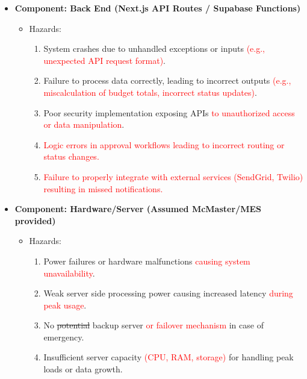 \documentclass{article}
\begin{document}
\begin{itemize}
    \item \textbf{Component: Back End (Next.js API Routes / Supabase Functions)} %
    \begin{itemize}
        \item Hazards:
        \begin{enumerate}
            \item System crashes due to unhandled exceptions or inputs \textcolor{red}{(e.g., unexpected API request format)}.
            \item Failure to process data correctly, leading to incorrect outputs \textcolor{red}{(e.g., miscalculation of budget totals, incorrect status updates)}.
            \item Poor security implementation exposing APIs \textcolor{red}{to unauthorized access or data manipulation}.
            \item \textcolor{red}{Logic errors in approval workflows leading to incorrect routing or status changes.}
            \item \textcolor{red}{Failure to properly integrate with external services (SendGrid, Twilio) resulting in missed notifications.}
        \end{enumerate}
    \end{itemize}

    \item \textbf{Component: Hardware/Server (Assumed McMaster/MES provided)} %
    \begin{itemize}
        \item Hazards:
        \begin{enumerate}
            \item Power failures or hardware malfunctions \textcolor{red}{causing system unavailability}.
            \item Weak server side processing power causing increased latency \textcolor{red}{during peak usage}.
            \item No \sout{potential} backup server \textcolor{red}{or failover mechanism} in case of emergency.
            \item Insufficient server capacity \textcolor{red}{(CPU, RAM, storage)} for handling peak loads or data growth.
        \end{enumerate}
    \end{itemize}


\end{itemize}
\end{document}

